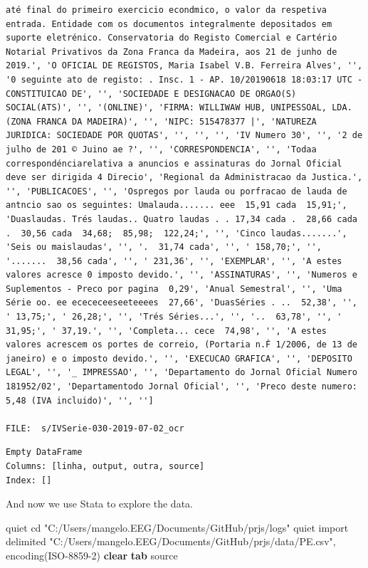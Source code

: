 \documentclass[
  12pt,
]{article}
\newenvironment{Shaded}{\begin{snugshade}}{\end{snugshade}}
\newcommand{\KeywordTok}[1]{\textcolor[rgb]{0.13,0.29,0.53}{\textbf{#1}}}
\newcommand{\NormalTok}[1]{#1}
\newcommand{\StringTok}[1]{\textcolor[rgb]{0.31,0.60,0.02}{#1}}
\begin{document}
\begin{verbatim}
até final do primeiro exercicio econdmico, o valor da respetiva entrada. Entidade com os documentos integralmente depositados em suporte eletrénico. Conservatoria do Registo Comercial e Cartério Notarial Privativos da Zona Franca da Madeira, aos 21 de junho de 2019.', 'O OFICIAL DE REGISTOS, Maria Isabel V.B. Ferreira Alves', '', '0 seguinte ato de registo: . Insc. 1 - AP. 10/20190618 18:03:17 UTC - CONSTITUICAO DE', '', 'SOCIEDADE E DESIGNACAO DE ORGAO(S) SOCIAL(ATS)', '', '(ONLINE)', 'FIRMA: WILLIWAW HUB, UNIPESSOAL, LDA. (ZONA FRANCA DA MADEIRA)', '', 'NIPC: 515478377 |', 'NATUREZA JURIDICA: SOCIEDADE POR QUOTAS', '', '', '', 'IV Numero 30', '', '2 de julho de 201 © Juino ae ?', '', 'CORRESPONDENCIA', '', 'Todaa correspondénciarelativa a anuncios e assinaturas do Jornal Oficial deve ser dirigida 4 Direcio', 'Regional da Administracao da Justica.', '', 'PUBLICACOES', '', 'Ospregos por lauda ou porfracao de lauda de antncio sao os seguintes: Umalauda....... eee  15,91 cada  15,91;', 'Duaslaudas. Trés laudas.. Quatro laudas . . 17,34 cada .  28,66 cada .  30,56 cada  34,68;  85,98;  122,24;', '', 'Cinco laudas.......', 'Seis ou maislaudas', '', '.  31,74 cada', '', ' 158,70;', '', '.......  38,56 cada', '', ' 231,36', '', 'EXEMPLAR', '', 'A estes valores acresce 0 imposto devido.', '', 'ASSINATURAS', '', 'Numeros e Suplementos - Preco por pagina  0,29', 'Anual Semestral', '', 'Uma Série oo. ee ecececeeseeteeees  27,66', 'DuasSéries . ..  52,38', '', ' 13,75;', ' 26,28;', '', 'Trés Séries...', '', '..  63,78', '', ' 31,95;', ' 37,19.', '', 'Completa... cece  74,98', '', 'A estes valores acrescem os portes de correio, (Portaria n.Ḟ 1/2006, de 13 de janeiro) e o imposto devido.', '', 'EXECUCAO GRAFICA', '', 'DEPOSITO LEGAL', '', '_ IMPRESSAO', '', 'Departamento do Jornal Oficial Numero 181952/02', 'Departamentodo Jornal Oficial', '', 'Preco deste numero:  5,48 (IVA incluido)', '', '']
   
FILE:  s/IVSerie-030-2019-07-02_ocr
\end{verbatim}

\begin{verbatim}
Empty DataFrame
Columns: [linha, output, outra, source]
Index: []
\end{verbatim}

And now we use Stata to explore the data.

\begin{Shaded}
\begin{Highlighting}[]

\NormalTok{quiet cd }\StringTok{"C:/Users/mangelo.EEG/Documents/GitHub/prjs/logs"}
\NormalTok{quiet import delimited }\StringTok{"C:/Users/mangelo.EEG/Documents/GitHub/prjs/data/PE.csv"}\NormalTok{, encoding(ISO{-}8859{-}2) }\KeywordTok{clear}
\KeywordTok{tab}\NormalTok{ source}
\end{Highlighting}
\end{Shaded}
\end{document}
